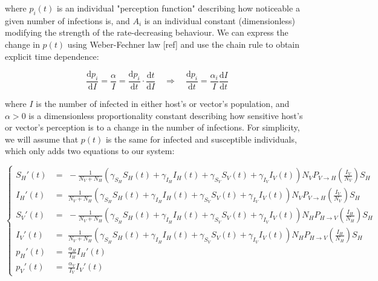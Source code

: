 where $p_i(t)$ is an individual "perception function" describing how noticeable a given number of infections is, and $A_i$ is an individual constant (dimensionless) modifying the strength of the rate-decreasing behaviour. We can express the change in $p(t)$ using  Weber-Fechner law [ref] and use the chain rule to obtain explicit time dependence:

\begin{equation}
    \frac{\mathrm{d}p_i}{\mathrm{d}I}  = \frac{\alpha}{I} = \frac{\mathrm{d}p_i}{\mathrm{d}t}\cdot \frac{\mathrm{d}t}{\mathrm{d}I} \quad \Longrightarrow \quad \frac{\mathrm{d}p_i}{\mathrm{d}t} = \frac{\alpha_i}{I}\frac{\mathrm{d}I}{\mathrm{d}t} 
\end{equation}

where $I$ is the number of infected in either host's or vector's population, and $\alpha>0$ is a dimensionless proportionality constant describing how sensitive host's or vector's perception is to a change in the number of infections. For simplicity, we will assume that $p(t)$ is the same for infected and susceptible individuals, which only adds two equations to our system: 

\begin{equation}
\left\{
\begin{array}{cl}
   S_H '(t) & = \,\,-\frac{1}{N_V + N_H}\left(\gamma_{S_H}S_H(t)  + \gamma_{I_H} I_H(t) + \gamma_{S_V} S_V(t) + \gamma_{I_V} I_V(t) \right) N_VP_{V\to H} \left(\frac{I_V}{N_V }\right)S_H  \\
     I_H'(t)& = \,\, \frac{1}{N_V + N_H}\left(\gamma_{S_H}S_H(t)  + \gamma_{I_H} I_H(t) + \gamma_{S_V} S_V(t) + \gamma_{I_V} I_V(t) \right) N_VP_{V\to H} \left(\frac{I_V}{N_V }\right)S_H \\
     S_V'(t)& = \,\, -\frac{1}{N_V + N_H}\left(\gamma_{S_H}S_H(t)  + \gamma_{I_H} I_H(t) + \gamma_{S_V} S_V(t) + \gamma_{I_V} I_V(t) \right) N_HP_{H\to V} \left(\frac{I_H}{N_H }\right)S_H \\
     I_V'(t)& = \,\, \frac{1}{N_V + N_H}\left(\gamma_{S_H}S_H(t)  + \gamma_{I_H} I_H(t) + \gamma_{S_V} S_V(t) + \gamma_{I_V} I_V(t) \right) N_HP_{H\to V} \left(\frac{I_H}{N_H }\right)S_H \\
     p_{H}'(t)& = \,\, \frac{\alpha_H}{I_H}I_H'(t) \\
     p_V'(t) & = \,\, \frac{\alpha_V}{I_V}I_V'(t)
\end{array}
\right.
\end{equation}

\endgroup